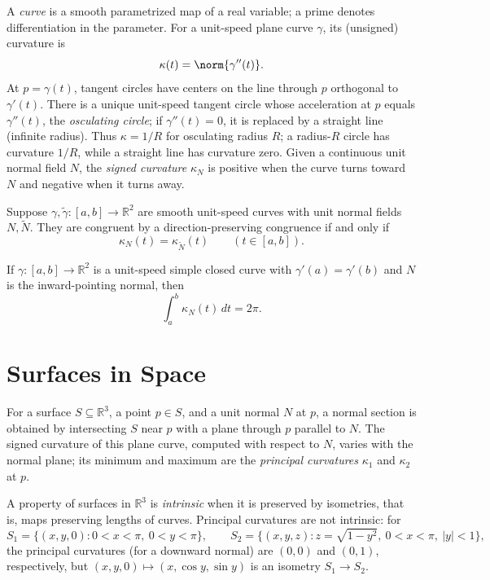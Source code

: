 A \emph{curve} is a smooth parametrized map of a real variable; a prime denotes differentiation in
the parameter. For a unit-speed plane curve $\gamma$, its (unsigned) curvature is
\[
\kappa(t)=\norm{\gamma''(t)}.
\]
At $p=\gamma(t)$, tangent circles have centers on the line through $p$ orthogonal to $\gamma'(t)$.
There is a unique unit-speed tangent circle whose acceleration at $p$ equals $\gamma''(t)$, the
\emph{osculating circle}; if $\gamma''(t)=0$, it is replaced by a straight line (infinite radius).
Thus $\kappa=1/R$ for osculating radius $R$; a radius-$R$ circle has curvature $1/R$, while a
straight line has curvature zero. Given a continuous unit normal field $N$, the \emph{signed curvature}
$\kappa_N$ is positive when the curve turns toward $N$ and negative when it turns away.

\begin{theorem}
\label{thm:plane-curve-classification}
\notready
Suppose $\gamma,\widetilde\gamma\colon[a,b]\to\mathbb R^2$ are smooth unit-speed curves with unit
normal fields $N,\widetilde N$. They are congruent by a direction-preserving congruence if and only if
\[
\kappa_N(t)=\kappa_{\widetilde N}(t)\qquad(t\in[a,b]).
\]
\end{theorem}

\begin{theorem}
\label{thm:total-curvature}
\notready
If $\gamma\colon[a,b]\to\mathbb R^2$ is a unit-speed simple closed curve with
$\gamma'(a)=\gamma'(b)$ and $N$ is the inward-pointing normal, then
\[
\int_a^b\kappa_N(t)\,dt=2\pi.
\]
\end{theorem}

\section{Surfaces in Space}

For a surface $S\subseteq\mathbb R^3$, a point $p\in S$, and a unit normal $N$ at $p$, a normal
section is obtained by intersecting $S$ near $p$ with a plane through $p$ parallel to $N$. The signed
curvature of this plane curve, computed with respect to $N$, varies with the normal plane; its minimum
and maximum are the \emph{principal curvatures} $\kappa_1$ and $\kappa_2$ at $p$.

A property of surfaces in $\mathbb R^3$ is \emph{intrinsic} when it is preserved by isometries,
that is, maps preserving lengths of curves. Principal curvatures are not intrinsic: for
\[
S_1=\{(x,y,0):0<x<\pi,\ 0<y<\pi\},\qquad
S_2=\{(x,y,z):z=\sqrt{1-y^2},\ 0<x<\pi,\ |y|<1\},
\]
the principal curvatures (for a downward normal) are $(0,0)$ and $(0,1)$, respectively, but
$(x,y,0)\mapsto(x,\cos y,\sin y)$ is an isometry $S_1\to S_2$.

